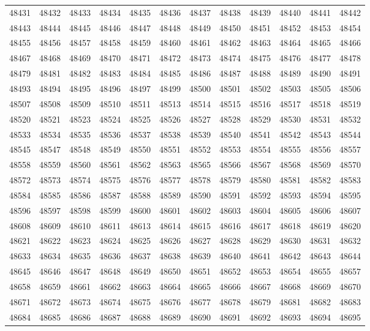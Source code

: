 \begin{center}
\begin{longtable}{llllllllllll}
48431 &48432 &48433 &48434 &48435 &48436 &48437 &48438 &48439 &48440 &48441 &48442 \\
48443 &48444 &48445 &48446 &48447 &48448 &48449 &48450 &48451 &48452 &48453 &48454 \\
48455 &48456 &48457 &48458 &48459 &48460 &48461 &48462 &48463 &48464 &48465 &48466 \\
48467 &48468 &48469 &48470 &48471 &48472 &48473 &48474 &48475 &48476 &48477 &48478 \\
48479 &48481 &48482 &48483 &48484 &48485 &48486 &48487 &48488 &48489 &48490 &48491 \\
48493 &48494 &48495 &48496 &48497 &48499 &48500 &48501 &48502 &48503 &48505 &48506 \\
48507 &48508 &48509 &48510 &48511 &48513 &48514 &48515 &48516 &48517 &48518 &48519 \\
48520 &48521 &48523 &48524 &48525 &48526 &48527 &48528 &48529 &48530 &48531 &48532 \\
48533 &48534 &48535 &48536 &48537 &48538 &48539 &48540 &48541 &48542 &48543 &48544 \\
48545 &48547 &48548 &48549 &48550 &48551 &48552 &48553 &48554 &48555 &48556 &48557 \\
48558 &48559 &48560 &48561 &48562 &48563 &48565 &48566 &48567 &48568 &48569 &48570 \\
48572 &48573 &48574 &48575 &48576 &48577 &48578 &48579 &48580 &48581 &48582 &48583 \\
48584 &48585 &48586 &48587 &48588 &48589 &48590 &48591 &48592 &48593 &48594 &48595 \\
48596 &48597 &48598 &48599 &48600 &48601 &48602 &48603 &48604 &48605 &48606 &48607 \\
48608 &48609 &48610 &48611 &48613 &48614 &48615 &48616 &48617 &48618 &48619 &48620 \\
48621 &48622 &48623 &48624 &48625 &48626 &48627 &48628 &48629 &48630 &48631 &48632 \\
48633 &48634 &48635 &48636 &48637 &48638 &48639 &48640 &48641 &48642 &48643 &48644 \\
48645 &48646 &48647 &48648 &48649 &48650 &48651 &48652 &48653 &48654 &48655 &48657 \\
48658 &48659 &48661 &48662 &48663 &48664 &48665 &48666 &48667 &48668 &48669 &48670 \\
48671 &48672 &48673 &48674 &48675 &48676 &48677 &48678 &48679 &48681 &48682 &48683 \\
48684 &48685 &48686 &48687 &48688 &48689 &48690 &48691 &48692 &48693 &48694 &48695 \\

\end{longtable}
\end{center}
